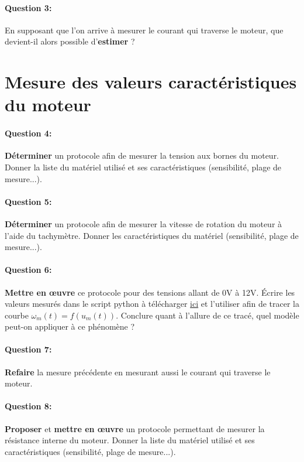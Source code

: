\paragraph{Question 3:} En supposant que l'on arrive à mesurer le courant qui traverse le moteur, que devient-il alors possible d'\textbf{estimer} ?

\newpage

\section{Mesure des valeurs caractéristiques du moteur} 

\paragraph{Question 4:} \textbf{Déterminer} un protocole afin de mesurer la tension aux bornes du moteur. Donner la liste du matériel utilisé et ses caractéristiques (sensibilité, plage de mesure...).

\paragraph{Question 5:} \textbf{Déterminer} un protocole afin de mesurer la vitesse de rotation du moteur à l'aide du tachymètre. Donner les caractéristiques du matériel (sensibilité, plage de mesure...).

\paragraph{Question 6:} \textbf{Mettre en \oe uvre} ce protocole pour des tensions allant de 0V à 12V. Écrire les valeurs mesurés dans le script python à télécharger 
\href{https://github.com/Costadoat/Sciences-Ingenieur/raw/master/S01\%20\nomsequence/TP01\%20Mod\%C3\%A9lisation\%20lin\%C3\%A9aire/Ilot_01\%20Moteur\%20\%C3\%A0\%20courant\%20continu/01-TP01-I01.py}{ici} 
et l'utiliser afin de tracer la courbe $\omega_m(t)=f(u_m(t))$. Conclure quant à l'allure de ce tracé, quel modèle peut-on appliquer à ce phénomène ?

\paragraph{Question 7:} \textbf{Refaire} la mesure précédente en mesurant aussi le courant qui traverse le moteur.

\paragraph{Question 8:} \textbf{Proposer} et \textbf{mettre en \oe uvre} un protocole permettant de mesurer la résistance interne du moteur. Donner la liste du matériel utilisé et ses caractéristiques (sensibilité, plage de mesure...).

